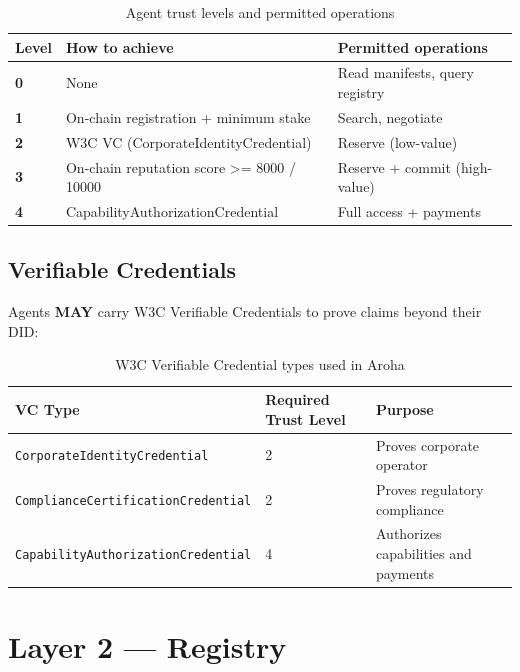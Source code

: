 \documentclass[11pt,a4paper]{article}
\begin{document}
\begin{table}[ht]
  \centering
  \renewcommand{\arraystretch}{1.3}
  \begin{tabularx}{\textwidth}{@{} >{\bfseries}l p{5.5cm} X @{}}
    \toprule
    Level & How to achieve & Permitted operations \\
    \midrule
    0 & None                                        & Read manifests, query registry \\
    1 & On-chain registration + minimum stake       & Search, negotiate \\
    2 & W3C VC (CorporateIdentityCredential)        & Reserve (low-value) \\
    3 & On-chain reputation score >= 8000 / 10000   & Reserve + commit (high-value) \\
    4 & CapabilityAuthorizationCredential           & Full access + payments \\
    \bottomrule
  \end{tabularx}
  \caption{Agent trust levels and permitted operations}
\end{table}

\subsection{Verifiable Credentials}

Agents \textbf{MAY} carry W3C Verifiable Credentials to prove claims beyond their DID:

\begin{table}[ht]
  \centering
  \renewcommand{\arraystretch}{1.3}
  \begin{tabularx}{\textwidth}{@{} l l X @{}}
    \toprule
    \textbf{VC Type} & \textbf{Required Trust Level} & \textbf{Purpose} \\
    \midrule
    \texttt{CorporateIdentityCredential}       & 2 & Proves corporate operator \\
    \texttt{ComplianceCertificationCredential} & 2 & Proves regulatory compliance \\
    \texttt{CapabilityAuthorizationCredential} & 4 & Authorizes capabilities and payments \\
    \bottomrule
  \end{tabularx}
  \caption{W3C Verifiable Credential types used in Aroha}
\end{table}

\section{Layer 2 --- Registry}
\end{document}
